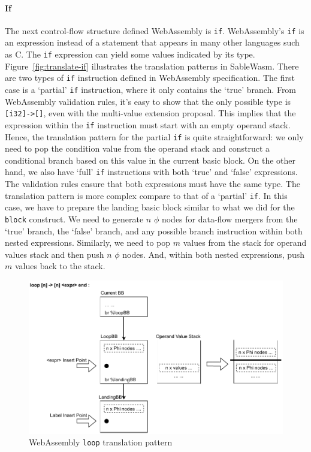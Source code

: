 \paragraph{If}
The next control-flow structure defined WebAssembly is \texttt{if}.
WebAssembly's \texttt{if} is an expression instead of a statement that appears
in many other languages such as C. The \texttt{if} expression can yield some
values indicated by its type. Figure~\ref{fig:translate-if} illustrates the
translation patterns in SableWasm. There are two types of \texttt{if}
instruction defined in WebAssembly specification. The first case is a `partial'
\texttt{if} instruction, where it only contains the `true' branch. From
WebAssembly validation rules, it's easy to show that the only possible type is
\texttt{[i32]->[]}, even with the multi-value extension proposal. This implies
that the expression within the \texttt{if} instruction must start with an empty
operand stack. Hence, the translation pattern for the partial \texttt{if} is
quite straightforward: we only need to pop the condition value from the operand
stack and construct a conditional branch based on this value in the current
basic block. On the other hand, we also have `full' \texttt{if} instructions
with both `true' and `false' expressions. The validation rules ensure that both
expressions must have the same type. The translation pattern is more complex
compare to that of a `partial' \texttt{if}. In this case, we have to prepare the
landing basic block similar to what we did for the \texttt{block} construct.
We need to generate $n$ $\phi$ nodes for data-flow mergers from the `true'
branch, the `false' branch, and any possible branch instruction within both
nested expressions. Similarly, we need to pop $m$ values from the stack for
operand values stack and then push $n$ $\phi$ nodes. And, within both nested
expressions, push $m$ values back to the stack.

\begin{figure}
  \centering
  \includegraphics[width=\textwidth]{Images/4.MIR/translate-loop.pdf}
  \caption{WebAssembly \texttt{loop} translation pattern}
  \label{fig:translate-loop}
\end{figure}

